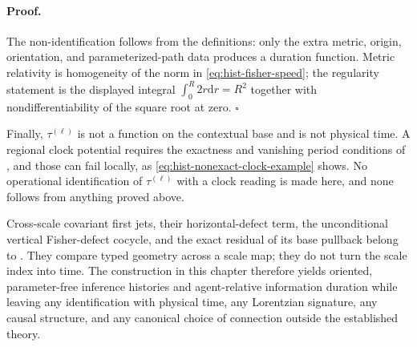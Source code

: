 \paragraph{Proof.}
The non-identification follows from the definitions: only the extra metric,
origin, orientation, and parameterized-path data produces a duration function.
Metric relativity is homogeneity of the norm in
\eqref{eq:hist-fisher-speed}; the regularity statement is the displayed
integral $\int_0^R2r\mathrm dr=R^2$ together with nondifferentiability of the
square root at zero.  $\square$

Finally, $\tau^{(\ell)}$ is not a function on the contextual base and is not
physical time.  A regional clock potential requires the exactness and vanishing
period conditions of , and those can fail
locally, as \eqref{eq:hist-nonexact-clock-example} shows.  No operational
identification of $\tau^{(\ell)}$ with a clock reading is made here, and none
follows from anything proved above.  

Cross-scale covariant first jets, their horizontal-defect term, the
unconditional vertical Fisher-defect cocycle, and the exact residual of its
base pullback belong to .  They compare typed
geometry across a scale map; they do not turn the scale index into time.  The
construction in this chapter therefore yields oriented, parameter-free
inference histories and agent-relative information duration while leaving any
identification with physical time, any Lorentzian signature, any causal
structure, and any canonical choice of connection outside the established
theory.  
